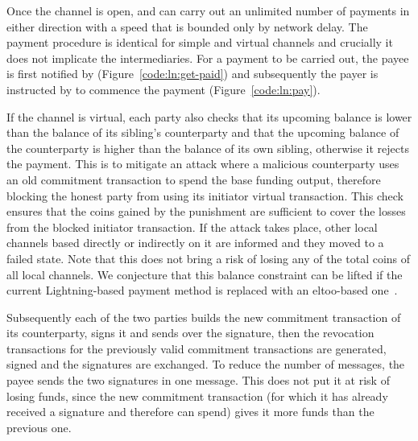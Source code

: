   Once the channel is open, \alice and \bob can carry out an unlimited number of
  payments in either direction with a speed that is bounded only by network
  delay. The payment procedure is identical for simple and virtual channels and
  crucially it does not implicate the intermediaries. For a payment to be
  carried out, the payee is first notified by \environment
  (Figure~\ref{code:ln:get-paid}) and subsequently the payer is instructed by
  \environment to commence the payment (Figure~\ref{code:ln:pay}).

  If the channel is virtual, each party also checks that its upcoming balance is
  lower than the balance of its sibling's counterparty and that the upcoming
  balance of the counterparty is higher than the balance of its own sibling,
  otherwise it rejects the payment. This is to mitigate an attack where a
  malicious counterparty uses an old commitment transaction to spend the base
  funding output, therefore blocking the honest party from using its initiator
  virtual transaction. This check ensures that the coins gained by the
  punishment are sufficient to cover the losses from the blocked initiator
  transaction. If the attack takes place, other local channels based directly or
  indirectly on it are informed and they moved to a failed state. Note that this
  does not bring a risk of losing any of the total coins of all local channels.
  We conjecture that this balance constraint can be lifted if the current
  Lightning-based payment method is replaced with an eltoo-based
  one~\cite{eltoo}.

  Subsequently each of the two parties builds the new commitment transaction of
  its counterparty, signs it and sends over the signature, then the revocation
  transactions for the previously valid commitment transactions are generated,
  signed and the signatures are exchanged. To reduce the number of messages, the
  payee sends the two signatures in one message. This does not put it at risk of
  losing funds, since the new commitment transaction (for which it has already
  received a signature and therefore can spend) gives it more funds than the
  previous one.

